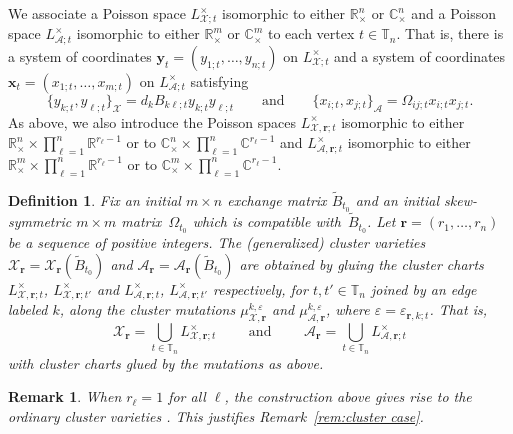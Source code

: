 \documentclass{amsart}
\newtheorem{definition}[theorem]{Definition}
\newtheorem{remark}[theorem]{Remark}
\numberwithin{equation}{section}
\newcommand{\bfr}{{\boldsymbol{r}}}
\newcommand{\bfx}{{\boldsymbol{x}}}
\newcommand{\bfy}{{\boldsymbol{y}}}
\newcommand{\cA}{\mathcal{A}}
\newcommand{\cX}{\mathcal{X}}
\newcommand{\CC}{\mathbb{C}}
\newcommand{\RR}{\mathbb{R}}
\newcommand{\TT}{\mathbb{T}}
\begin{document}
We associate a Poisson space $L^\times_{\cX;t}$ isomorphic to either $\RR_\times^n$ or $\CC_\times^n$ and a Poisson space $L^\times_{\cA;t}$ isomorphic to either $\RR_\times^m$ or $\CC_\times^m$ to each vertex $t\in\TT_n$.
That is, there is a system of coordinates $\bfy_t=(y_{1;t},\ldots,y_{n;t})$ on $L^\times_{\cX;t}$ and a system of coordinates $\bfx_t=(x_{1;t},\ldots,x_{m;t})$ on $L^\times_{\cA;t}$ satisfying
\begin{equation}
  \label{eq:brackets3}
  \{y_{k;t},y_{\ell;t}\}_\cX=d_kB_{k\ell;t}y_{k;t}y_{\ell;t}\qquad\text{and}\qquad\{x_{i;t},x_{j;t}\}_\cA=\Omega_{ij;t}x_{i;t}x_{j;t}.
\end{equation}
As above, we also introduce the Poisson spaces $L^\times_{\cX,\bfr;t}$ isomorphic to either $\RR_\times^n\times\prod_{\ell=1}^n \RR^{r_\ell-1}$ or to $\CC_\times^n\times\prod_{\ell=1}^n \CC^{r_\ell-1}$ and $L^\times_{\cA,\bfr;t}$ isomorphic to either $\RR_\times^m\times\prod_{\ell=1}^n \RR^{r_\ell-1}$ or to $\CC_\times^m\times\prod_{\ell=1}^n \CC^{r_\ell-1}$.

\begin{definition}
  \label{def:cluster varieties}
  Fix an initial $m\times n$ exchange matrix $\tilde B_{t_0}$ and an initial skew-symmetric $m\times m$ matrix~$\Omega_{t_0}$ which is compatible with~$\tilde B_{t_0}$.
  Let $\bfr=(r_1,\ldots,r_n)$ be a sequence of positive integers.
  The \emph{(generalized) cluster varieties} $\cX_\bfr=\cX_\bfr(\tilde B_{t_0})$ and $\cA_\bfr=\cA_\bfr(\tilde B_{t_0})$ are obtained by gluing the cluster charts $L^\times_{\cX,\bfr;t}$, $L^\times_{\cX,\bfr;t'}$ and $L^\times_{\cA,\bfr;t}$, $L^\times_{\cA,\bfr;t'}$ respectively, for $t,t'\in\TT_n$ joined by an edge labeled $k$, along the cluster mutations $\mu_{\cX,\bfr}^{k,\varepsilon}$ and $\mu_{\cA,\bfr}^{k,\varepsilon}$, where $\varepsilon=\varepsilon_{\bfr,k;t}$.
  That is, 
  \begin{equation}
    \label{eq:cluster varieties}
    \cX_\bfr=\bigcup_{t\in\TT_n} L^\times_{\cX,\bfr;t}\qquad\text{ and }\qquad\cA_\bfr=\bigcup_{t\in\TT_n} L^\times_{\cA,\bfr;t}
  \end{equation}
  with cluster charts glued by the mutations as above.
\end{definition}
\begin{remark}
  \label{rem:cluster case 2}
  When $r_\ell=1$ for all $\ell$, the construction above gives rise to the ordinary cluster varieties \cite{FZ02,FG09a}.
  This justifies Remark~\ref{rem:cluster case}.
\end{remark}
\end{document}
